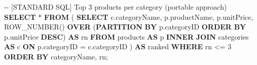 \documentclass[
  letterpaper,
  DIV=11,
  numbers=noendperiod]{scrreprt}
\newenvironment{Shaded}{\begin{snugshade}}{\end{snugshade}}
\newcommand{\CommentTok}[1]{\textcolor[rgb]{0.37,0.37,0.37}{#1}}
\newcommand{\DecValTok}[1]{\textcolor[rgb]{0.68,0.00,0.00}{#1}}
\newcommand{\FunctionTok}[1]{\textcolor[rgb]{0.28,0.35,0.67}{#1}}
\newcommand{\KeywordTok}[1]{\textcolor[rgb]{0.00,0.23,0.31}{\textbf{#1}}}
\newcommand{\NormalTok}[1]{\textcolor[rgb]{0.00,0.23,0.31}{#1}}
\newcommand{\OperatorTok}[1]{\textcolor[rgb]{0.37,0.37,0.37}{#1}}
\begin{document}
\begin{codelisting}

\caption{\texttt{duckdb}}

\begin{Shaded}
\begin{Highlighting}[]
\CommentTok{{-}{-} [STANDARD SQL] Top 3 products per category (portable approach)}
\KeywordTok{SELECT} \OperatorTok{*}
\KeywordTok{FROM}\NormalTok{ (}
    \KeywordTok{SELECT}
\NormalTok{        c.categoryName,}
\NormalTok{        p.productName,}
\NormalTok{        p.unitPrice,}
        \FunctionTok{ROW\_NUMBER}\NormalTok{() }\KeywordTok{OVER}\NormalTok{ (}\KeywordTok{PARTITION} \KeywordTok{BY}\NormalTok{ p.categoryID }\KeywordTok{ORDER} \KeywordTok{BY}\NormalTok{ p.unitPrice }\KeywordTok{DESC}\NormalTok{) }\KeywordTok{AS}\NormalTok{ rn}
    \KeywordTok{FROM}\NormalTok{ products }\KeywordTok{AS}\NormalTok{ p}
    \KeywordTok{INNER} \KeywordTok{JOIN}\NormalTok{ categories }\KeywordTok{AS}\NormalTok{ c }\KeywordTok{ON}\NormalTok{ p.categoryID }\OperatorTok{=}\NormalTok{ c.categoryID}
\NormalTok{) }\KeywordTok{AS}\NormalTok{ ranked}
\KeywordTok{WHERE}\NormalTok{ rn }\OperatorTok{\textless{}=} \DecValTok{3}
\KeywordTok{ORDER} \KeywordTok{BY}\NormalTok{ categoryName, rn;}
\end{Highlighting}
\end{Shaded}

\end{codelisting}
\end{document}
